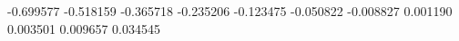 -0.699577
-0.518159
-0.365718
-0.235206
-0.123475
-0.050822
-0.008827
0.001190
0.003501
0.009657
0.034545
